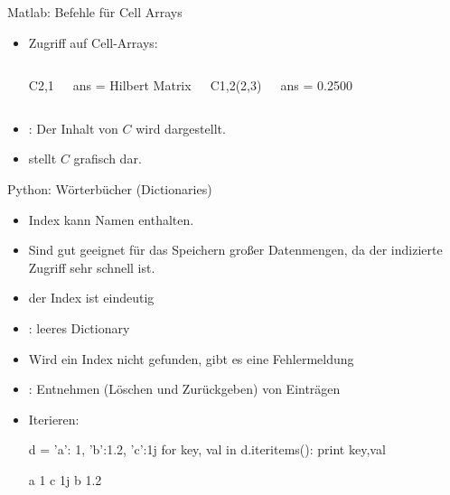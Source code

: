 \documentclass[hyperref={xetex}]{beamer}
\begin{document}
%
%
\begin{frame}[fragile]{Matlab: Befehle für Cell Arrays}
\begin{itemize}
\item Zugriff auf Cell-Arrays:\\ 
\begin{columns}[c]
\begin{matlabin} 
C{2,1}
\end{matlabin}
\begin{matlab}
ans =
Hilbert Matrix
\end{matlab}
\begin{matlabin}
C{1,2}(2,3)
\end{matlabin}
\begin{matlab}
ans =
    0.2500
\end{matlab}
\end{columns}
\item {}: Der Inhalt von $C$ wird dargestellt.
\item {} stellt $C$ grafisch dar.
\end{itemize}
\end{frame}

\begin{frame}[fragile]{Python: Wörterbücher (Dictionaries)}
\begin{itemize}
\item Index kann Namen enthalten.
\item Sind gut geeignet für das Speichern großer Datenmengen, da der indizierte Zugriff sehr schnell ist. 
\item der Index ist eindeutig
\item {}: leeres Dictionary
\item Wird ein Index nicht gefunden, gibt es eine Fehlermeldung
\item {}: Entnehmen (Löschen und Zurückgeben) von Einträgen 
\item Iterieren:
\begin{pyin}
d = {'a': 1, 'b':1.2, 'c':1j}
for key, val in d.iteritems():
  print key,val        
\end{pyin}
\begin{pyout}
a 1
c 1j
b 1.2
\end{pyout}
\end{itemize}
\end{frame}
\end{document}
